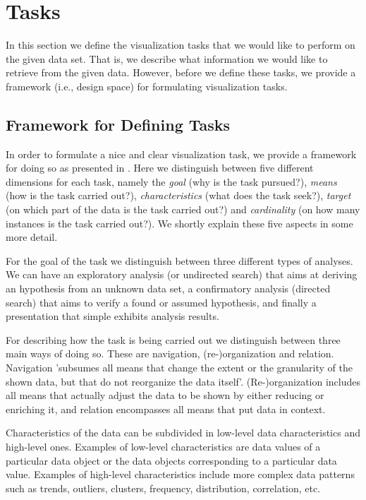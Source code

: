 \section{Tasks}\label{sec:tasks}

In this section we define the visualization tasks that we would like to perform on the given data set. That is, we describe what information we would like to retrieve from the given data. However, before we define these tasks, we provide a framework (i.e., design space) for formulating visualization tasks.

\subsection{Framework for Defining Tasks}
In order to formulate a nice and clear visualization task, we provide a framework for doing so as presented in \cite{schulz2013design}. Here we distinguish between five different dimensions for each task, namely the \textit{goal} (why is the task pursued?), \textit{means} (how is the task carried out?), \textit{characteristics} (what does the task seek?), \textit{target} (on which part of the data is the task carried out?) and \textit{cardinality} (on how many instances is the task carried out?). We shortly explain these five aspects in some more detail.

For the goal of the task we distinguish between three different types of analyses. We can have an exploratory analysis (or undirected search) that aims at deriving an hypothesis from an unknown data set, a confirmatory analysis (directed search) that aims to verify a found or assumed hypothesis, and finally a presentation that simple exhibits analysis results.

For describing how the task is being carried out we distinguish between three main ways of doing so. These are navigation, (re-)organization and relation. Navigation 'subsumes all means that change the extent or the granularity of the shown data, but that do not reorganize the data itself'. (Re-)organization includes all means that actually adjust the data to be shown by either reducing or enriching it, and relation encompasses all means that put data in context.

Characteristics of the data can be subdivided in low-level data characteristics and high-level ones. Examples of low-level characteristics are data values of a particular data object or the data objects corresponding to a particular data value. Examples of high-level characteristics include more complex data patterns such as trends, outliers, clusters, frequency, distribution, correlation, etc.

